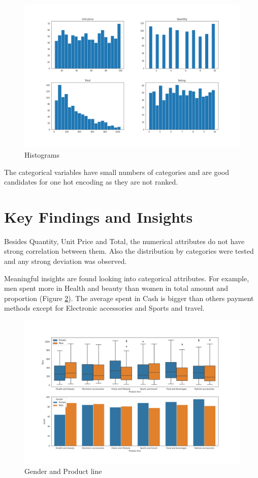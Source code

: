 \documentclass[11pt, a4]{article}
\begin{document}
\begin{figure}[!h]
\includegraphics[scale=0.35]{hist}
\centering
\caption{Histograms}
\label{fig:hist}
\end{figure}


The categorical variables have small numbers of categories and are good candidates for one hot encoding as they are not ranked.

\section*{Key Findings and Insights}

Besides Quantity, Unit Price and Total, the numerical attributes do not have strong correlation between them. Also the distribution by categories were tested and any strong deviation was observed.

Meaningful insights are found looking into categorical attributes. For example, men spent more in Health and beauty than women in total amount and proportion (Figure \ref{fig:box}). The average spent in Cash is bigger than others payment methods except for Electronic accessories and Sports and travel.

\begin{figure}[!h]
\includegraphics[scale=0.35]{boxgender}
\centering
\caption{Gender and Product line}
\label{fig:box}
\end{figure}
\end{document}
